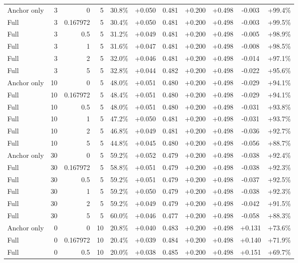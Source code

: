 \begin{table}[htbp]
\begin{tabular}{lrrrccccccc}
Anchor only & 3 & 0 & 5 & 30.8\% & +0.050 & 0.481 & +0.200 & +0.498 & -0.003 & +99.4\% \\
Full & 3 & 0.167972 & 5 & 30.4\% & +0.050 & 0.481 & +0.200 & +0.498 & -0.003 & +99.5\% \\
Full & 3 & 0.5 & 5 & 31.2\% & +0.049 & 0.481 & +0.200 & +0.498 & -0.005 & +98.9\% \\
Full & 3 & 1 & 5 & 31.6\% & +0.047 & 0.481 & +0.200 & +0.498 & -0.008 & +98.5\% \\
Full & 3 & 2 & 5 & 32.0\% & +0.046 & 0.481 & +0.200 & +0.498 & -0.014 & +97.1\% \\
Full & 3 & 5 & 5 & 32.8\% & +0.044 & 0.482 & +0.200 & +0.498 & -0.022 & +95.6\% \\
Anchor only & 10 & 0 & 5 & 48.0\% & +0.051 & 0.480 & +0.200 & +0.498 & -0.029 & +94.1\% \\
Full & 10 & 0.167972 & 5 & 48.4\% & +0.051 & 0.480 & +0.200 & +0.498 & -0.029 & +94.1\% \\
Full & 10 & 0.5 & 5 & 48.0\% & +0.051 & 0.480 & +0.200 & +0.498 & -0.031 & +93.8\% \\
Full & 10 & 1 & 5 & 47.2\% & +0.050 & 0.481 & +0.200 & +0.498 & -0.031 & +93.7\% \\
Full & 10 & 2 & 5 & 46.8\% & +0.049 & 0.481 & +0.200 & +0.498 & -0.036 & +92.7\% \\
Full & 10 & 5 & 5 & 44.8\% & +0.045 & 0.480 & +0.200 & +0.498 & -0.056 & +88.7\% \\
Anchor only & 30 & 0 & 5 & 59.2\% & +0.052 & 0.479 & +0.200 & +0.498 & -0.038 & +92.4\% \\
Full & 30 & 0.167972 & 5 & 58.8\% & +0.051 & 0.479 & +0.200 & +0.498 & -0.038 & +92.3\% \\
Full & 30 & 0.5 & 5 & 59.2\% & +0.051 & 0.479 & +0.200 & +0.498 & -0.037 & +92.5\% \\
Full & 30 & 1 & 5 & 59.2\% & +0.050 & 0.479 & +0.200 & +0.498 & -0.038 & +92.3\% \\
Full & 30 & 2 & 5 & 59.2\% & +0.049 & 0.479 & +0.200 & +0.498 & -0.042 & +91.5\% \\
Full & 30 & 5 & 5 & 60.0\% & +0.046 & 0.477 & +0.200 & +0.498 & -0.058 & +88.3\% \\
Anchor only & 0 & 0 & 10 & 20.8\% & +0.040 & 0.483 & +0.200 & +0.498 & +0.131 & +73.6\% \\
Full & 0 & 0.167972 & 10 & 20.4\% & +0.039 & 0.484 & +0.200 & +0.498 & +0.140 & +71.9\% \\
Full & 0 & 0.5 & 10 & 20.0\% & +0.038 & 0.485 & +0.200 & +0.498 & +0.151 & +69.7\% \\

\end{tabular}
\end{table}
